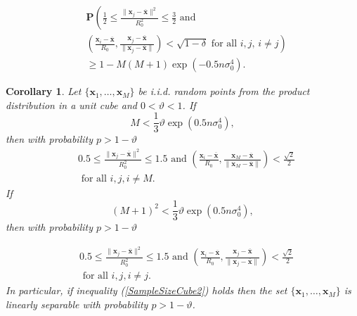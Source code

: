 \documentclass[final,5p,times,twocolumn]{elsarticle}
\newtheorem{col}{Corollary}
\begin{document}
\begin{equation}\label{Eq:cube4}
\begin{split}
&\mathbf{P}\left(\frac{1}{2}  \leq \frac{\|\boldsymbol{x}_j-\overline{\boldsymbol{x}}\|^2}{R^2_0}\leq\frac{3}{2} \mbox{ and } \right. \\
&\left.
\left(\frac{\boldsymbol{x}_i-\overline{\boldsymbol{x}}}{R_0},\frac{\boldsymbol{x}_j-\overline{\boldsymbol{x}}}{\| \boldsymbol{x}_j-\overline{\boldsymbol{x}}\| }\right)<\sqrt{1-\delta} \mbox{ for all } i,j, \, i\neq j \right)\\
&\geq 1-M(M+1)\exp\left(-0.5 n\sigma_0^4 \right).
\end{split}
\end{equation}

\begin{col}
 Let  $\{\boldsymbol{x}_1, \ldots , \boldsymbol{x}_M\}$ be i.i.d. random points  from the product distribution in a unit cube and $0<\vartheta<1$. If
  \begin{equation}\label{SampleSizeCube1}
 M<\frac{1}{3}\vartheta \exp\left(0.5 n\sigma_0^4 \right),
 \end{equation}
  then with probability $p>1-\vartheta$
\[
\begin{split}
&  0.5\leq \frac{\|\boldsymbol{x}_j-\overline{\boldsymbol{x}}\|^2}{R_0^2} \leq 1.5 \mbox{ and }
\left(\frac{\boldsymbol{x}_i-\overline{\boldsymbol{x}}}{R_0},\frac{\boldsymbol{x}_M-\overline{\boldsymbol{x}}}{\| \boldsymbol{x}_M-\overline{\boldsymbol{x}}\|}\right)<\frac{\sqrt{2}}{2} \\
&\mbox{  for all } i,j, i \neq M.
\end{split}
\]
 If
  \begin{equation}\label{SampleSizeCube2}
(M+1)^2<\frac{1}{3}\vartheta \exp\left(0.5 n\sigma_0^4 \right),
 \end{equation}
   then with probability $p>1-\vartheta$

\[
\begin{split}
&0.5\leq \frac{\|\boldsymbol{x}_j-\overline{\boldsymbol{x}}\|^2}{R_0^2} \leq 1.5 \mbox{ and }
\left(\frac{\boldsymbol{x}_i-\overline{\boldsymbol{x}}}{R_0},\frac{\boldsymbol{x}_j-\overline{\boldsymbol{x}}}{\| \boldsymbol{x}_j-\overline{\boldsymbol{x}}\|}\right)<\frac{\sqrt{2}}{2} \\
& \mbox{ for all }i,j, i\neq j.
\end{split}
\]
In particular, if inequality (\ref{SampleSizeCube2}) holds then the set   $\{\boldsymbol{x}_1, \ldots , \boldsymbol{x}_M\}$ is linearly separable with probability $p>1-\vartheta$.
   \end{col}
\end{document}
